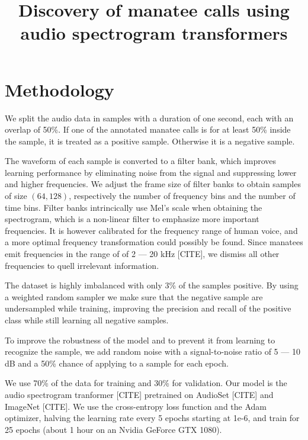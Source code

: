 \documentclass{article}
\begin{document}
\title{Discovery of manatee calls using audio spectrogram transformers}
\maketitle

\section{Methodology}
We split the audio data in samples with a duration of one second, each with an overlap of 50\%. If one of the annotated manatee calls is for at least 50\% inside the sample, it is treated as a positive sample. Otherwise it is a negative sample.

The waveform of each sample is converted to a filter bank, which improves learning performance by eliminating noise from the signal and suppressing lower and higher frequencies. We adjust the frame size of filter banks to obtain samples of size $(64,128)$, respectively the number of frequency bins and the number of time bins. Filter banks intrincically use Mel's scale when obtaining the spectrogram, which is a non-linear filter to emphasize more important frequencies. It is however calibrated for the frequency range of human voice, and a more optimal frequency transformation could possibly be found. Since manatees emit frequencies in the range of of 2 — 20 kHz [CITE], we dismiss all other frequencies to quell irrelevant information.

The dataset is highly imbalanced with only 3\% of the samples positive. By using a weighted random sampler we make sure that the negative sample are undersampled while training, improving the precision and recall of the positive class while still learning all negative samples.

To improve the robustness of the model and to prevent it from learning to recognize the sample, we add random noise with a signal-to-noise ratio of 5 — 10 dB and a 50\% chance of applying to a sample for each epoch.

We use 70\% of the data for training and 30\% for validation. Our model is the audio spectrogram tranformer [CITE] pretrained on AudioSet [CITE] and ImageNet [CITE]. We use the cross-entropy loss function and the Adam optimizer, halving the learning rate every 5 epochs starting at 1e-6, and train for 25 epochs (about 1 hour on an Nvidia GeForce GTX 1080).
\end{document}
